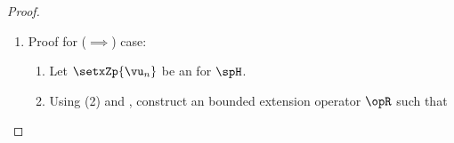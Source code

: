 \begin{proof}
\begin{enumerate}
\begin{enumerate}
\begin{enumerate}
          \item Proof for lower bound $A$:
            \begin{align*}
              \norm{\sum_{n=1}^\infty \alpha_n\vx_n}^2 
                &=   \frac{\normop{\opRi}^2}{\normop{\opRi}^2}\,\norm{\sum_{n=1}^\infty \alpha_n\vx_n}^2 
                &&   \text{because $\normop{\opRi}>0$}&&\text{\xref{prop:op_norm}}
              \\&\ge \frac{1}{\normop{\opRi}^2}\,\norm{\opRi\sum_{n=1}^\infty \alpha_n\vx_n}^2 
                &&   \text{by \prefp{thm:LxLx}}
              \\&=   \frac{1}{\normop{\opRi}^2}\,\norm{\opRi\sum_{n=1}^\infty \alpha_n\opR\vu_n}^2 
                &&   \text{by definition of $\opR$}&&\text{\xref{item:rieszAB_R}}
              \\&=   \frac{1}{\normop{\opRi}^2}\,\norm{\opRi\opR\sum_{n=1}^\infty \alpha_n\vu_n}^2 
                &&   \text{by property of \structe{linear operator}s}
                &&   \text{\xref{thm:L_prop}}
              \\&=   \frac{1}{\normop{\opRi}^2}\,\norm{\sum_{n=1}^\infty \alpha_n\vu_n}^2 
                &&   \text{by definition of inverse op.}
                &&   \text{\ifxref{operator}{def:opI}}
              \\&=   \frac{1}{\normop{\opRi}^2}\,\sum_{n=1}^\infty \norm{\alpha_n\vu_n}^2 
                &&   \text{by \thme{Pythagorean Theorem}}
                &&\text{\ifxref{vsinprod}{thm:pythag}}
              \\&=   \frac{1}{\normop{\opRi}^2}\,\sum_{n=1}^\infty \abs{\alpha_n}^2 \norm{\vu_n}^2
                &&   \text{by $\normn$ \prope{homogeneous} prop.}
                &&\text{\xref{def:norm}}
              \\&=   \mcom{\frac{1}{\normop{\opRi}^2}}{$A$}\,\sum_{n=1}^\infty \abs{\alpha_n}^2 
                &&   \text{by def. of \prope{orthonormality}}
                &&\text{\xref{def:orthog}}
            \end{align*}
        \end{enumerate}
    \end{enumerate}
  \item Proof for ($\implies$) case:
    \begin{enumerate}
      \item Let $\setxZp{\vu_n}$ be an  for $\spH$.
      \item Using (2) and , construct an bounded extension operator $\opR$ such that 

\end{enumerate}
\end{enumerate}
\end{proof}
